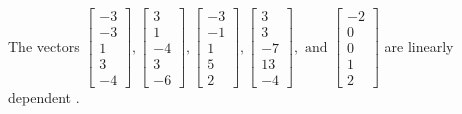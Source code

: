 \begin{exercise}
\begin{exerciseStatement}
  \end{exerciseStatement}
  \begin{exerciseAnswer}
   The vectors \(\left[\begin{array}{r}
-3 \\
-3 \\
1 \\
3 \\
-4
\end{array}\right] , \left[\begin{array}{r}
3 \\
1 \\
-4 \\
3 \\
-6
\end{array}\right] , \left[\begin{array}{r}
-3 \\
-1 \\
1 \\
5 \\
2
\end{array}\right] , \left[\begin{array}{r}
3 \\
3 \\
-7 \\
13 \\
-4
\end{array}\right] , \text{ and } \left[\begin{array}{r}
-2 \\
0 \\
0 \\
1 \\
2
\end{array}\right]\) are 
  	 linearly dependent  .
  


  \end{exerciseAnswer}
\end{exercise}